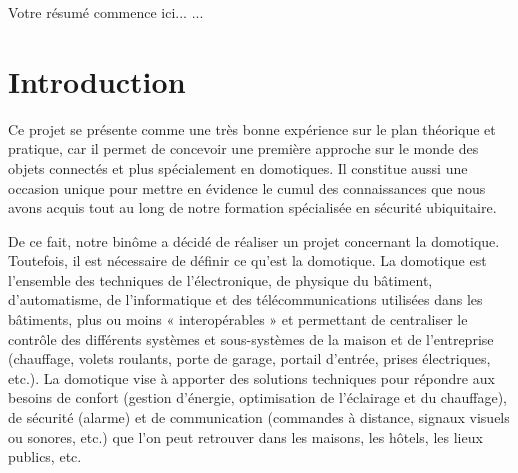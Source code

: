    Votre résumé commence ici...
   ...

\newpage
\tableofcontents
\clearpage

%
% 
%
%
%
%



\newpage
\chapter{Introduction}

Ce projet se présente comme une très bonne expérience sur le plan théorique et pratique, car il permet de concevoir une première approche sur le monde des objets connectés et plus spécialement en domotiques. Il constitue aussi une occasion unique pour mettre en évidence le cumul des connaissances que nous avons acquis tout au long de notre formation spécialisée en sécurité ubiquitaire.


De ce fait, notre binôme a décidé de réaliser un projet concernant la domotique. Toutefois, il est nécessaire de définir ce qu'est la domotique. La domotique est l'ensemble des techniques de l'électronique, de physique du bâtiment, d'automatisme, de l'informatique et des télécommunications utilisées dans les bâtiments, plus ou moins « interopérables » et permettant de centraliser le contrôle des différents systèmes et sous-systèmes de la maison et de l'entreprise (chauffage, volets roulants, porte de garage, 
portail d'entrée, prises électriques, etc.). La domotique vise à apporter des solutions techniques pour répondre aux besoins de 
confort (gestion d'énergie, optimisation de l'éclairage et du chauffage), de sécurité (alarme) et de communication (commandes à 
distance, signaux visuels ou sonores, etc.) que l'on peut retrouver dans les maisons, les hôtels, les lieux publics, etc.



